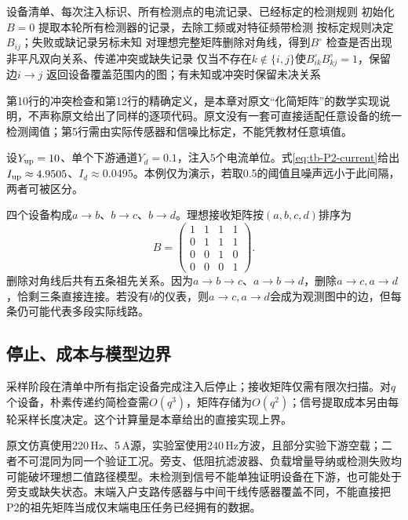 \begin{algorithm}[htbp]
\caption{P2原文流程与教材化的传递约简}
\label{alg:tb-P2}
\begin{algorithmic}[1]
\Require 设备清单、每次注入标识、所有检测点的电流记录、已经标定的检测规则
\State 初始化$B=0$
 \State 提取本轮所有检测器的记录，去除工频或对特征频带检测
  \State 按标定规则决定$B_{ij}$；失败或缺记录另标未知
 \EndFor
\EndFor
\State 对理想完整矩阵删除对角线，得到$B^\circ$
\State 检查是否出现非平凡双向关系、传递冲突或缺失记录
 \State 仅当不存在$k\notin\{i,j\}$使$B^\circ_{ik}B^\circ_{kj}=1$，保留边$i\to j$
\EndFor
\State 返回设备覆盖范围内的图；有未知或冲突时保留未决关系
\end{algorithmic}
\end{algorithm}
第10行的冲突检查和第12行的精确定义，是本章对原文“化简矩阵”的数学实现说明，不声称原文给出了同样的逐项代码。原文没有一套可直接适配任意设备的统一检测阈值；第5行需由实际传感器和信噪比标定，不能凭教材任意填值。

\begin{example}
设$Y_{\rm up}=10$、单个下游通道$Y_d=0.1$，注入$5$个电流单位。式\eqref{eq:tb-P2-current}给出
$I_{\rm up}\approx4.9505$、$I_d\approx0.0495$。本例仅为演示，若取0.5的阈值且噪声远小于此间隔，两者可被区分。

四个设备构成$a\to b$、$b\to c$、$b\to d$。理想接收矩阵按$(a,b,c,d)$排序为
\[
 B=\begin{pmatrix}
 1&1&1&1\\0&1&1&1\\0&0&1&0\\0&0&0&1
 \end{pmatrix}.
\]
删除对角线后共有五条祖先关系。因为$a\to b\to c$、$a\to b\to d$，删除$a\to c,a\to d$，恰剩三条直接连接。若没有$b$的仪表，则$a\to c,a\to d$会成为观测图中的边，但每条仍可能代表多段实际线路。
\end{example}

\subsection{停止、成本与模型边界}

采样阶段在清单中所有指定设备完成注入后停止；接收矩阵仅需有限次扫描。对$q$个设备，朴素传递约简检查需$O(q^3)$，矩阵存储为$O(q^2)$；信号提取成本另由每轮采样长度决定。这个计算量是本章给出的直接实现上界。

原文仿真使用220\,Hz、5\,A源，实验室使用240\,Hz方波，且部分实验下游空载；二者不可混同为同一个验证工况。旁支、低阻抗滤波器、负载增量导纳或检测失败均可能破坏理想二值路径模型。未检测到信号不能单独证明设备在下游，也可能处于旁支或缺失状态。末端入户支路传感器与中间干线传感器覆盖不同，不能直接把P2的祖先矩阵当成仅末端电压任务已经拥有的数据。

